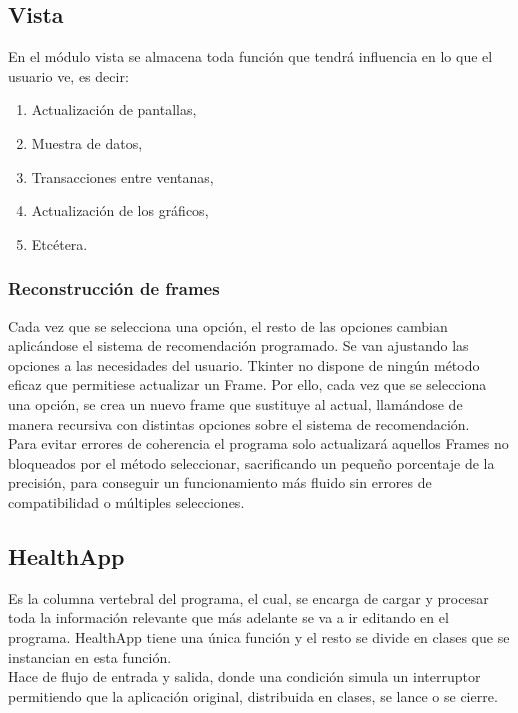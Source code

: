 \subsection{Vista}
En el módulo vista se almacena toda función que tendrá influencia en lo que el usuario ve, es decir:
\begin{enumerate}
\item Actualización de pantallas,
\item Muestra de datos,
\item Transacciones entre ventanas,
\item Actualización de los gráficos,
\item Etcétera.
\end{enumerate} 


\subsubsection{Reconstrucción de frames}

Cada vez que se selecciona una opción, el resto de las opciones cambian aplicándose el sistema de recomendación programado. Se van ajustando las opciones a las necesidades del usuario. Tkinter no dispone de ningún método eficaz que permitiese actualizar un Frame. Por ello, cada vez que se selecciona una opción, se crea un nuevo frame que sustituye al actual, llamándose de manera recursiva con distintas opciones sobre el sistema de recomendación.\\

Para evitar errores de coherencia el programa solo actualizará aquellos Frames no bloqueados por el método seleccionar, sacrificando un pequeño porcentaje de la precisión, para conseguir un funcionamiento más fluido sin errores de compatibilidad o múltiples selecciones.\\
\subsection{HealthApp}
Es la columna vertebral del programa, el cual, se encarga de cargar y procesar toda la información relevante que más adelante se va a ir editando en el programa. HealthApp tiene una única función y el resto se divide en clases que se instancian en esta función.\\

Hace de flujo de entrada y salida, donde una condición simula un interruptor permitiendo que la aplicación original, distribuida en clases, se lance o se cierre.\\


